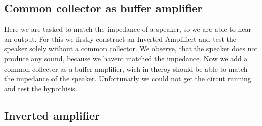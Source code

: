 \documentclass[a4paper,10pt]{article}
\numberwithin{equation}{section}
\begin{document}
\begin{multicols}{2}
	\subsection{Common collector as buffer amplifier}
	Here we are tasked to match the impedance of a speaker, so we are able to hear an output. For this we firstly construct an Inverted Amplifiert and test the speaker solely without a common collector. We observe, that the speaker does not produce any sound, because we havent matched the impedance. Now we add a common collecter as a buffer amplifier, wich in theroy should be able to match the impedance of the speaker. Unfortunatly we could not get the circut running and test the hypothisis.

	\subsection{Inverted amplifier}

\end{multicols}
\end{document}
